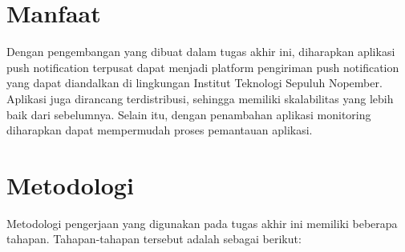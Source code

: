 \section{Manfaat}
Dengan pengembangan yang dibuat dalam tugas akhir ini, diharapkan aplikasi push notification terpusat dapat menjadi platform pengiriman push notification yang dapat diandalkan di lingkungan Institut Teknologi Sepuluh Nopember. Aplikasi juga dirancang terdistribusi, sehingga memiliki skalabilitas yang lebih baik dari sebelumnya. Selain itu, dengan penambahan aplikasi monitoring diharapkan dapat mempermudah proses pemantauan aplikasi.

\section {Metodologi}
Metodologi pengerjaan yang digunakan pada tugas akhir ini memiliki beberapa tahapan. Tahapan-tahapan tersebut adalah sebagai berikut:

